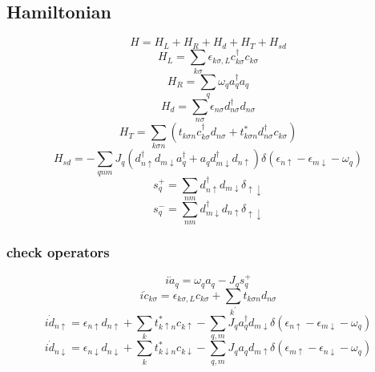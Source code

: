 \subsection{Hamiltonian}
\begin{equation}
H=H_{L}+H_{R}+H_{d}+H_{T}+H_{s d}
\end{equation}
\begin{equation}
H_{L}=\sum_{k \sigma} \epsilon_{k \sigma, L} c_{k \sigma}^{\dagger} c_{k \sigma}
\end{equation}
\begin{equation}
H_{R}=\sum_{q} \omega_{q} a_{q}^{\dagger} a_{q}
\end{equation}
\begin{equation}
H_{d}=\sum_{n \sigma} \epsilon_{n \sigma} d_{n \sigma}^{\dagger} d_{n \sigma}
\end{equation}
\begin{equation}
H_{T}=\sum_{k \sigma n}\left(t_{k \sigma n} c_{k \sigma}^{\dagger} d_{n \sigma}+t_{k \sigma n}^{*} d_{n \sigma}^{\dagger} c_{k \sigma}\right)
\end{equation}
\begin{equation}
H_{s d}=-\sum_{q n m} J_{q}\left(d_{n \uparrow}^{\dagger} d_{m \downarrow} a_{q}^{\dagger}+a_{q} d_{m \downarrow}^{\dagger} d_{n \uparrow}\right) \delta\left(\epsilon_{n \uparrow}-\epsilon_{m \downarrow}-\omega_{q}\right)
\end{equation}
\begin{equation}
s_{q}^{+}=\sum_{n m} d_{n \uparrow}^{\dagger} d_{m \downarrow} \delta_{\uparrow \downarrow}
\end{equation}
\begin{equation}
s_{q}^{-}=\sum_{n m} d_{m \downarrow}^{\dagger} d_{n \uparrow} \delta_{\uparrow \downarrow}
\end{equation}
\subsubsection{check operators}
\begin{equation}
i \dot{a}_{q}=\omega_{q} a_{q}-J_{q} s_{q}^{+}
\end{equation}
\begin{equation}
i \dot{c}_{k \sigma}=\epsilon_{k \sigma, L} c_{k \sigma}+\sum_{k^{\prime}} t_{k \sigma n} d_{n \sigma}
\end{equation}
\begin{equation}
i \dot{d}_{n \uparrow}=\epsilon_{n \uparrow} d_{n \uparrow}+\sum_{k} t_{k \uparrow n}^{*} c_{k \uparrow}-\sum_{q, m} J_{q} a_{q}^{\dagger}d_{m \downarrow}\delta(\epsilon_{n \uparrow}-\epsilon_{m \downarrow}-\omega_{q})
\end{equation}
\begin{equation}
i \dot{d}_{n \downarrow}=\epsilon_{n \downarrow} d_{n \downarrow}+\sum_{k} t_{k \downarrow n}^{*} c_{k \downarrow}-\sum_{q, m} J_{q} a_{q}d_{m \uparrow}\delta(\epsilon_{m \uparrow}-\epsilon_{n \downarrow}-\omega_{q})
\end{equation}
